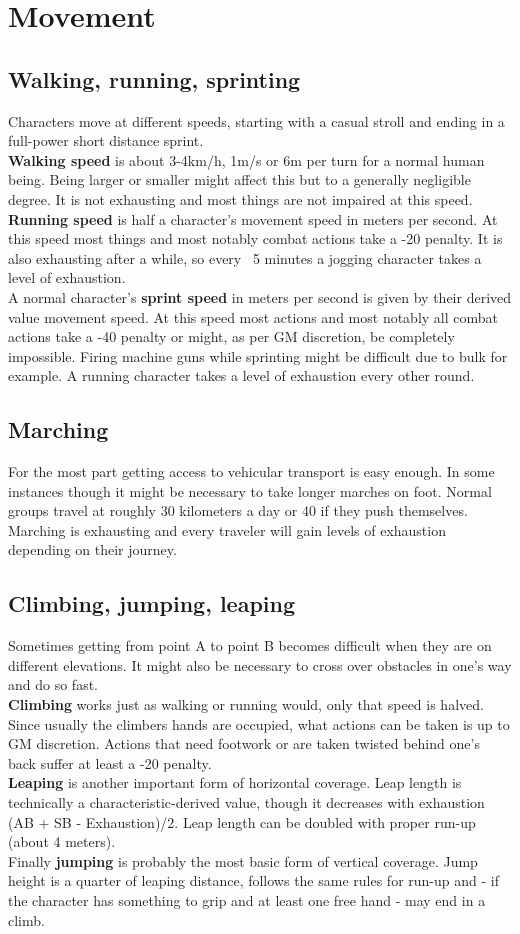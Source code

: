 \documentclass[12pt,a4paper,openany]{book}
\begin{document}
	\chapter{Movement}
	\section{Walking, running, sprinting}
	Characters move at different speeds, starting with a casual stroll and ending in a full-power short distance sprint.\\
	\textbf{Walking speed} is about 3-4km/h, 1m/s or 6m per turn for a normal human being. Being larger or smaller might affect this but to a generally negligible degree. It is not exhausting and most things are not impaired at this speed.\\
	\textbf{Running speed} is half a character’s movement speed in meters per second. At this speed most things and most notably combat actions take a -20 penalty. It is also exhausting after a while, so every ~5 minutes a jogging character takes a level of exhaustion.\\
	A normal character’s \textbf{sprint speed} in meters per second is given by their derived value movement speed. At this speed most actions and most notably all combat actions take a -40 penalty or might, as per GM discretion, be completely impossible. Firing machine guns while sprinting might be difficult due to bulk for example. A running character takes a level of exhaustion every other round.
	\section{Marching}
	For the most part getting access to vehicular transport is easy enough. In some instances though it might be necessary to take longer marches on foot. Normal groups travel at roughly 30 kilometers a day or 40 if they push themselves. Marching is exhausting and every traveler will gain levels of exhaustion depending on their journey.
	\section{Climbing, jumping, leaping}
	Sometimes getting from point A to point B becomes difficult when they are on different elevations. It might also be necessary to cross over obstacles in one’s way and do so fast.\\
	\textbf{Climbing} works just as walking or running would, only that speed is halved. Since usually the climbers hands are occupied, what actions can be taken is up to GM discretion. Actions that need footwork or are taken twisted behind one’s back suffer at least a -20 penalty.\\
	\textbf{Leaping} is another important form of horizontal coverage. Leap length is technically a characteristic-derived value, though it decreases with exhaustion (AB + SB - Exhaustion)/2. Leap length can be doubled with proper run-up (about 4 meters).\\
	Finally \textbf{jumping} is probably the most basic form of vertical coverage. Jump height is a quarter of leaping distance, follows the same rules for run-up and - if the character has something to grip and at least one free hand - may end in a climb.
\end{document}
